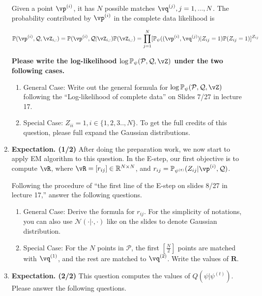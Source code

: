 \begin{Q}
\begin{enumerate}
Given a point $\vp^{(i)}$, it has $N$ possible matches $\vq^{(j)}, j=1,...,N$. The probability contributed by $\vp^{(i)}$ in the complete data likelihood is

\begin{equation}
    \mathbb{P}(\vp^{(i)},\mathcal{Q},\vZ_{i,:})=\mathbb{P}(\vp^{(i)},\mathcal{Q}|\vZ_{i,:})\mathbb{P}(\vZ_{i,:})= \prod_{j=1}^{N}[\mathbb{P}_\psi((\vp^{(i)}, \vq^{(j)})|Z_{ij}=1)\mathbb{P}(Z_{ij}=1)]^{Z_{ij}}
\end{equation}

\textbf{Please write the log-likelihood $\log{\mathbb{P}_{\psi}(\mathcal{P}, \mathcal{Q}, \vZ)}$ under the two following cases.}

\begin{enumerate}
    \item General Case: Write out the general formula for $\log{\mathbb{P}_{\psi}(\mathcal{P}, \mathcal{Q}, \vZ)}$ following the ``Log-likelihood of complete data'' on Slides 7/27 in lecture 17.
    \item Special Case: $Z_{ii}=1, i\in\{1,2,3.., N\}$. To get the full credits of this question, please full expand the Gaussian distributions.
\end{enumerate}

\item \textbf{Expectation. (1/2)} After doing the preparation work, we now start to apply EM algorithm to this question. In the E-step, our first objective is to compute $\vR$, where $\vR=[r_{ij}]\in\mathbb{R}^{N\times N}$, and $r_{ij}=\mathbb{P}_{\psi^{(t)}}(Z_{ij}|\vp^{(i)}, \mathcal{Q})$.

Following the procedure of ``the first line of the E-step on slides 8/27 in lecture 17,'' answer the following questions.

\begin{enumerate}
    \item General Case: Derive the formula for $r_{ij}$. For the simplicity of notations, you can also use $\mathcal{N}(\cdot|\cdot, \cdot)$ like on the slides to denote Gaussian distribution.
    \item Special Case: For the $N$ points in $\mathcal{P}$, the first $[\frac{N}{2}]$ points are matched with $\vq^{(1)}$, and the rest are matched to $\vq^{(2)}$. Write the values of $\bm{R}$.
\end{enumerate}

\item \textbf{Expectation. (2/2)} This question computes the values of $Q(\psi|\psi^{(t)})$. Please answer the following questions.


\end{enumerate}
\end{Q}
